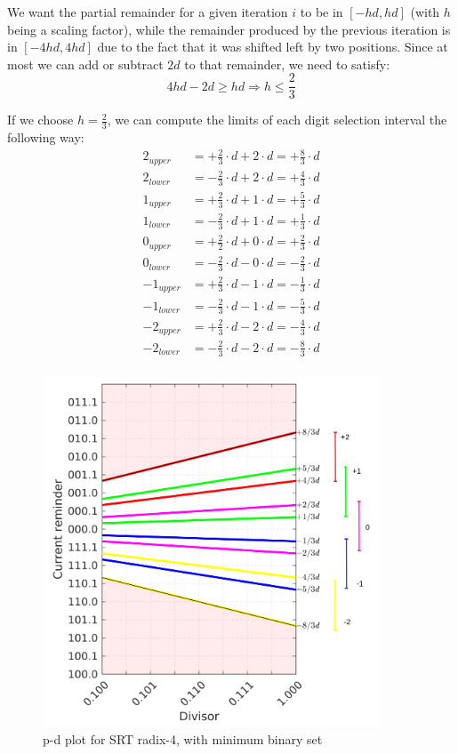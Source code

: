 We want the partial remainder for a given iteration $i$ to be in $[-hd, hd]$ (with $h$ being a scaling factor), while the remainder produced by the previous iteration is in $[-4hd, 4hd]$ due to the fact that it was shifted left by two positions. 
Since at most we can add or subtract $2d$ to that remainder, we need to satisfy:
\[
    4hd - 2d \ge hd \Rightarrow h \le \frac{2}{3}
\]

If we choose $h = \frac{2}{3}$, we can compute the limits of each digit selection interval the following way: 
\begin{align*} 
2_{upper} &= +\frac{2}{3}\cdot d + 2 \cdot d = +\frac{8}{3}\cdot d \\
2_{lower} &= -\frac{2}{3}\cdot d + 2 \cdot d = +\frac{4}{3}\cdot d \\
1_{upper} &= +\frac{2}{3}\cdot d + 1 \cdot d = +\frac{5}{3}\cdot d \\
1_{lower} &= -\frac{2}{3}\cdot d + 1 \cdot d = +\frac{1}{3}\cdot d\\
0_{upper} &= +\frac{2}{2}\cdot d + 0 \cdot d= +\frac{2}{3}\cdot d  \\
0_{lower} &= -\frac{2}{3} \cdot d - 0 \cdot d = -\frac{2}{3} \cdot d\\
-1_{upper} &= +\frac{2}{3}\cdot d - 1 \cdot d = -\frac{1}{3}\cdot d \\
-1_{lower} &= -\frac{2}{3}\cdot d - 1 \cdot d = -\frac{5}{3}\cdot d \\
-2_{upper} &= +\frac{2}{3}\cdot d - 2 \cdot d = -\frac{4}{3}\cdot d \\
-2_{lower} &= -\frac{2}{3}\cdot d - 2 \cdot d = -\frac{8}{3}\cdot d \\
\end{align*}

\begin{figure}
    \centering
    \includegraphics[width=100mm]{images/pd_plot_r4.png}
    \caption{p-d plot for SRT radix-4, with minimum binary set}
    \label{fig:pd_radix_4}
\end{figure}

